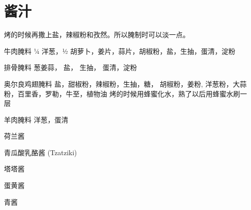 \section{酱汁}

烤的时候再撒上盐，辣椒粉和孜然。所以腌制时可以淡一点。

牛肉腌料
¼ 洋葱，½ 胡萝卜，姜片，蒜片，胡椒粉，盐，生抽，蛋清，淀粉

排骨腌料
葱姜蒜， 盐， 生抽， 蛋清，淀粉

奥尔良鸡翅腌料
盐，甜椒粉，辣椒粉，生抽，糖， 胡椒粉，姜粉, 洋葱粉，大蒜粉，百里香，罗勒，牛至，植物油
烤的时候用蜂蜜化水，熟了以后用蜂蜜水刷一层

羊肉腌料
洋葱，蛋清



荷兰酱

青瓜酸乳酪酱 (Tzatziki)

塔塔酱

蛋黄酱

青酱
